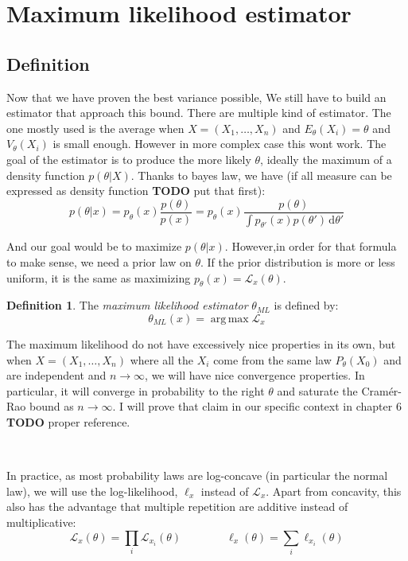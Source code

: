 \documentclass[10pt]{report}
\theoremstyle{plain}
\theoremstyle{definition}
\newtheorem{defn}{Definition}[chapter]
\theoremstyle{remark}
\newcommand{\dd}{\mathrm{d}}
\DeclareMathOperator{\argmax}{arg\,max}
\newcommand{\ml}{_{M\!L}}
\begin{document}
\section{Maximum likelihood estimator}

\subsection{Definition}

Now that we have proven the best variance possible, We still have to build an
estimator that approach this bound. There are multiple kind of estimator. The
one mostly used is the average when $X = (X_1,\ldots,X_n)$ and
$E_\theta(X_i) = \theta$ and $V_\theta(X_i)$ is small enough. However in more
complex case this wont work. The goal of the estimator is to produce the more
likely $\theta$, ideally the maximum of a density function $p(\theta | X)$.
Thanks to bayes law, we have (if all measure can be expressed as density
function \textbf{TODO} put that first):
\[p(\theta|x) = p_\theta(x) \frac {p(\theta)}{p(x)}
  = p_\theta(x) \frac {p(\theta)}{\int p_{\theta'}(x)p(\theta')\,\dd \theta'}\]

And our goal would be to maximize $p(\theta|x)$. However,in order for that
formula to make sense, we need a prior law on $\theta$. If the prior
distribution is more or less uniform, it is the same as maximizing $p_\theta(x)
= \mathcal{L}_x(\theta)$.


\begin{defn}
  The \emph{maximum likelihood estimator} $\theta\ml$ is defined by:
  \[\theta\ml(x) = \argmax \mathcal{L}_x\]
\end{defn}

The maximum likelihood do not have excessively nice properties in its own, but
when $X = (X_1,\ldots,X_n)$ where all the $X_i$ come from the same law
$P_\theta(X_0)$ and are independent and $n \to \infty$,
we will have nice convergence properties. In particular, it will converge in
probability to the right
$\theta$ and saturate the Cramér-Rao bound as $n \to \infty$. I will prove that
claim in our specific context in chapter 6 \textbf{TODO} proper reference.

\

In practice, as most probability laws are log-concave (in particular the normal
law), we will use the log-likelihood, $\ell_x$ instead of $\mathcal{L}_x$. Apart
from concavity, this also has the advantage that multiple repetition are
additive instead of multiplicative:
\[\mathcal{L}_x(\theta) = \prod_i \mathcal{L}_{x_i}(\theta) \quad \quad \quad
  \quad \ell_x(\theta) = \sum_i \ell_{x_i}(\theta)\]
\end{document}
